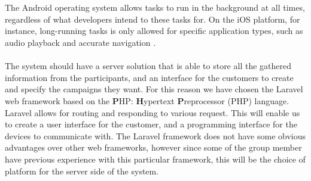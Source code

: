 \\\\
The Android operating system allows tasks to run in the background at all times, regardless of what developers intend to these tasks for. On the iOS platform, for instance, long-running tasks is only allowed for specific application types, such as audio playback and accurate navigation \parencite{apple_long_running_task}.
\\\\
The system should have a server solution that is able to store all the gathered information from the participants, and an interface for the customers to create and specify the campaigns they want. For this reason we have chosen the Laravel web framework based on the \textbf{P}HP: \textbf{H}ypertext \textbf{P}reprocessor (PHP) language. Laravel allows for routing and responding to various request. This will enable us to create a user interface for the customer, and a programming interface for the devices to communicate with. The Laravel framework does not have some obvious advantages over other web frameworks, however since some of the group member have previous experience with this particular framework, this will be the choice of platform for the server side of the system.


